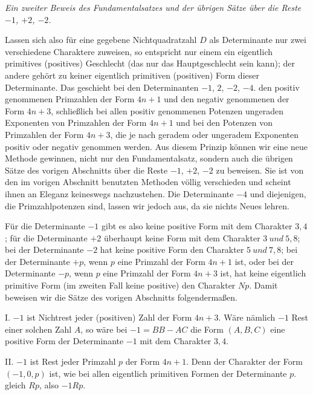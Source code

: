 \begin{center}
\textit{Ein zweiter Beweis des Fundamentalsatzes und der übrigen Sätze über die Reste $-1$, $+2$, $-2$.}
\end{center}

Lassen sich also für eine gegebene Nichtquadratzahl $D$ als Determinante nur zwei verschiedene Charaktere zuweisen, so entspricht nur einem ein eigentlich primitives (positives) Geschlecht (das nur das Hauptgeschlecht sein kann); der andere gehört zu keiner eigentlich primitiven (positiven) Form dieser Determinante. Das geschieht bei den Determinanten $-1$, $2$, $-2$, $-4$. den positiv genommenen Primzahlen der Form $4n+1$ und den negativ genommenen der Form $4n+3$, schließlich bei allen positiv genommenen Potenzen ungeraden Exponenten von Primzahlen der Form $4n+1$ und bei den Potenzen von Primzahlen der Form $4n+3$, die je nach geradem oder ungeradem Exponenten positiv oder negativ genommen werden. Aus diesem Prinzip können wir eine neue Methode gewinnen, nicht nur den Fundamentalsatz, sondern auch die übrigen Sätze des vorigen Abschnitts über die Reste $-1$, $+2$, $-2$ zu beweisen. Sie ist von den im
vorigen Abschnitt benutzten Methoden völlig verschieden und scheint ihnen an Eleganz keineswegs nachzustehen. Die Determinante $-4$ und diejenigen, die Primzahlpotenzen sind, lassen wir jedoch aus, da sie nichts Neues lehren.

Für die Determinante $-1$ gibt es also keine positive Form mit dem Charakter $3,4$; für die Determinante $+2$ überhaupt keine Form mit dem Charakter $3\ \mathit{und}\ 5,8$; bei der Determinante $-2$ hat keine positive Form den Charakter $5\ \mathit{und}\ 7,8$; bei der Determinante $+p$, wenn $p$ eine Primzahl der Form $4n+1$ ist, oder bei der Determinante $-p$, wenn $p$ eine Primzahl der Form $4n+3$ ist, hat keine eigentlich primitive Form (im zweiten Fall keine positive) den Charakter $Np$. Damit beweisen wir die Sätze des vorigen Abschnitts folgendermaßen.

I. $-1$ ist Nichtrest jeder (positiven) Zahl der Form $4n+3$. Wäre nämlich $-1$ Rest einer solchen Zahl $A$, so wäre bei $-1=BB-AC$ die Form $(A,B,C)$ eine positive Form der Determinante $-1$ mit dem Charakter $3,4$.

II. $-1$ ist Rest jeder Primzahl $p$ der Form $4n+1$. Denn der Charakter der Form $(-1,0,p)$ ist, wie bei allen eigentlich primitiven Formen der Determinante $p$. gleich $Rp$, also $-1Rp$.

